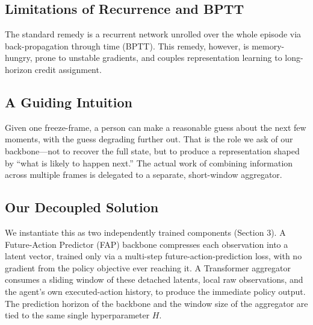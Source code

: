 \documentclass[11pt]{article}
\begin{document}
\subsection{Limitations of Recurrence and BPTT}
The standard remedy is a recurrent network unrolled over the whole episode via back-propagation through time (BPTT). This remedy, however, is memory-hungry, prone to unstable gradients, and couples representation learning to long-horizon credit assignment.

\subsection{A Guiding Intuition}
Given one freeze-frame, a person can make a reasonable guess about the next few moments, with the guess degrading further out. That is the role we ask of our backbone—not to recover the full state, but to produce a representation shaped by ``what is likely to happen next.'' The actual work of combining information across multiple frames is delegated to a separate, short-window aggregator.

\subsection{Our Decoupled Solution}
We instantiate this as two independently trained components (Section 3). A Future-Action Predictor (FAP) backbone compresses each observation into a latent vector, trained only via a multi-step future-action-prediction loss, with no gradient from the policy objective ever reaching it. A Transformer aggregator consumes a sliding window of these detached latents, local raw observations, and the agent's own executed-action history, to produce the immediate policy output. The prediction horizon of the backbone and the window size of the aggregator are tied to the same single hyperparameter \(H\).
\end{document}
